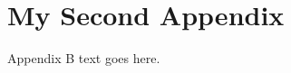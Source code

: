 \chapter{My Second Appendix}	%
Appendix B text goes here.

\blinditemize

\blinddescription

\endinput